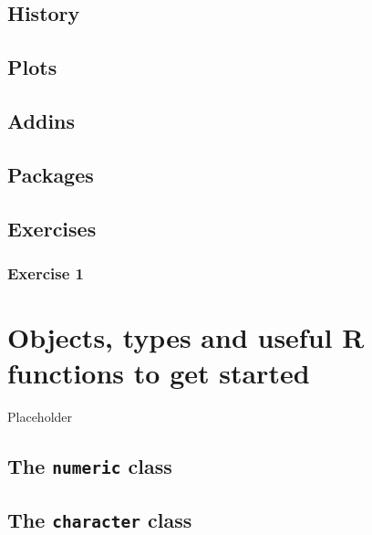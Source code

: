 \documentclass[]{gitbook}
\begin{document}
\hypertarget{history}{%
\subsection{History}\label{history}}

\hypertarget{plots}{%
\subsection{Plots}\label{plots}}

\hypertarget{addins}{%
\subsection{Addins}\label{addins}}

\hypertarget{packages}{%
\subsection{Packages}\label{packages}}

\hypertarget{exercises}{%
\subsection{Exercises}\label{exercises}}

\hypertarget{exercise-1}{%
\subsubsection*{Exercise 1}\label{exercise-1}}

\hypertarget{objects-types-and-useful-r-functions-to-get-started}{%
\section{Objects, types and useful R functions to get started}\label{objects-types-and-useful-r-functions-to-get-started}}

Placeholder

\hypertarget{the-numeric-class}{%
\subsection{\texorpdfstring{The \texttt{numeric} class}{The numeric class}}\label{the-numeric-class}}

\hypertarget{the-character-class}{%
\subsection{\texorpdfstring{The \texttt{character} class}{The character class}}\label{the-character-class}}
\end{document}
